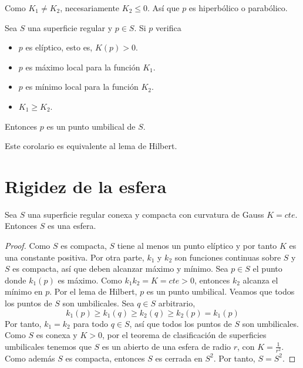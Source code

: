 \begin{note}
    Como $K_1 \neq K_2$, necesariamente $K_2 \leq 0$. Así que $p$ es hiperbólico o parabólico.
\end{note}

\begin{corollary}
    Sea $S$ una superficie regular y $p \in S$. Si $p$ verifica
    \begin{itemize}
        \item $p$ es elíptico, esto es, $K(p) > 0$.
        \item $p$ es máximo local para la función $K_1$.
        \item $p$ es mínimo local para la función $K_2$.
        \item $K_1 \geq K_2$.
    \end{itemize}
    Entonces $p$ es un punto umbilical de $S$.
\end{corollary}

\begin{note}
    Este corolario es equivalente al lema de Hilbert.
\end{note}

\section{Rigidez de la esfera}

\begin{theorem}
    Sea $S$ una superficie regular conexa y compacta con curvatura de Gauss $K = cte$.
    Entonces $S$ es una esfera.

    \begin{proof}
        Como $S$ es compacta, $S$ tiene al menos un punto elíptico y por tanto $K$ es una constante positiva.
        Por otra parte, $k_1$ y $k_2$ son funciones continuas sobre $S$ y $S$ es compacta, así que deben alcanzar máximo y mínimo.
        Sea $p \in S$ el punto donde $k_1(p)$ es máximo.
        Como $k_1 k_2 = K = cte > 0$, entonces $k_2$ alcanza el mínimo en $p$.
        Por el lema de Hilbert, $p$ es un punto umbilical.
        Veamos que todos los puntos de $S$ son umbilicales.
        Sea $q \in S$ arbitrario, $$k_1(p) \geq k_1(q) \geq k_2(q) \geq k_2(p) = k_1(p)$$
        Por tanto, $k_1 = k_2$ para todo $q \in S$, así que todos los puntos de $S$ son umbilicales.
        Como $S$ es conexa y $K>0$, por el teorema de clasificación de superficies umbilicales tenemos que $S$ es un abierto de una esfera de radio $r$, con $K = \frac{1}{r^2}$.
        Como además $S$ es compacta, entonces $S$ es cerrada en $S^2$.
        Por tanto, $S = S^2$.
    \end{proof}
\end{theorem}

